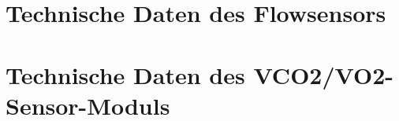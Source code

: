 \chapter{Technische Daten des Flowsensors}


\chapter{Technische Daten des \gls{VCO2}/\gls{VO2}-Sensor-Moduls}

